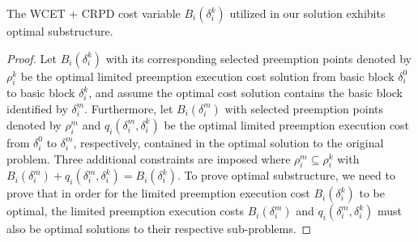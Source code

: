 \begin{theorem}
\label{thm:optimal-substructure-cost}
The WCET + CRPD cost variable $B_{i}(\delta_{i}^{k})$ utilized in our solution exhibits optimal substructure.
\end{theorem}
%
\noindent
\begin{proof}
Let $B_{i}(\delta_{i}^{k})$ with its corresponding selected preemption points denoted by $\rho_{i}^{k}$ be the optimal limited preemption execution cost solution from basic block $\delta_{i}^{0}$ to basic block $\delta_{i}^{k}$, and assume the optimal cost solution contains the basic block identified by $\delta_{i}^{m}$. Furthermore, let $B_{i}(\delta_{i}^{m})$ with selected preemption points denoted by $\rho_{i}^{m}$ and $q_{i}(\delta_{i}^{m},\delta_{i}^{k})$ be the optimal limited preemption execution cost from $\delta_{i}^{0}$ to $\delta_{i}^{m}$, respectively, contained in the optimal solution to the original problem. Three additional constraints are imposed where $\rho_{i}^{m} \subseteq \rho_{i}^{k}$ with $B_{i}(\delta_{i}^{m}) + q_{i}(\delta_{i}^{m},\delta_{i}^{k}) = B_{i}(\delta_{i}^{k})$. To prove optimal substructure, we need to prove that in order for the limited preemption execution cost $B_{i}(\delta_{i}^{k})$ to be optimal, the limited preemption execution costs $B_{i}(\delta_{i}^{m})$ and $q_{i}(\delta_{i}^{m},\delta_{i}^{k})$ must also be optimal solutions to their respective sub-problems.


\end{proof}
